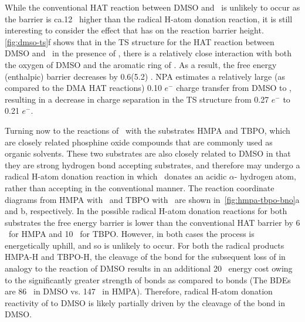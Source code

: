 While the conventional HAT reaction between DMSO and \bno\ is unlikely to occur
as the barrier is ca.\@ 12 \kcalmol\ higher than the radical H-atom donation
reaction, it is still interesting to consider the effect that  has on
the reaction barrier height. \ref{fig:dmso-ts}f shows that in the TS structure
for the HAT reaction between DMSO and \bno\ in the presence of , there
is a relatively close interaction with both the oxygen of DMSO and the aromatic
ring of \bno. As a result, the free energy (enthalpic) barrier decreases by
0.6(5.2) \kcalmol. NPA estimates a relatively large (as compared to the DMA HAT
reactions) 0.10 $e^-$ charge transfer from DMSO to , resulting in a
decrease in charge separation in the TS structure from 0.27 $e^-$ to 0.21 $e^-$.

Turning now to the reactions of \bno\ with the substrates HMPA and TBPO, which
are closely related phosphine oxide compounds that are commonly used as organic
solvents. These two substrates are also closely related to DMSO in that they are
strong hydrogen bond accepting substrates, and therefore may undergo a radical
H-atom donation reaction in which \bno\ donates an acidic $\alpha$-
hydrogen atom, rather than accepting in the conventional manner. The reaction
coordinate diagrams from HMPA with \bno\ and TBPO with \bno\ are shown
in~\ref{fig:hmpa-tbpo-bno}a and b, respectively. In the possible radical H-atom
donation reactions for both substrates the free energy barrier is lower than the
conventional HAT barrier by 6 \kcalmol\ for HMPA and 10 \kcalmol\ for TBPO.
However, in both cases the process is energetically uphill, and so is unlikely
to occur. For both the radical products HMPA-H and TBPO-H, the cleavage of the
 bond for the subsequent loss of  in analogy to the reaction of
DMSO results in an additional 20 \kcalmol\ energy cost owing to the
significantly greater strength of  bonds as compared to  bonds
(The BDEs are 86 \kcalmol\ in DMSO vs. 147 \kcalmol\ in
HMPA). Therefore, radical H-atom
donation reactivity of \bno to DMSO is likely partially driven by the cleavage
of the  bond in DMSO.

